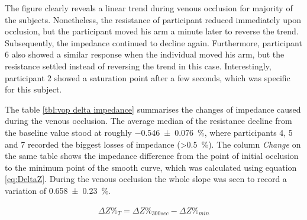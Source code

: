 The figure clearly reveals a linear trend during venous occlusion for majority of the subjects. Nonetheless, the resistance of participant reduced immediately upon occlusion, but the participant moved his arm a minute later to reverse the trend. Subsequently, the impedance continued to decline again. Furthermore, participant 6 also showed a similar response when the individual moved his arm, but the resistance settled instead of reversing the trend in this case. Interestingly, participant 2 showed a saturation point after a few seconds, which was specific for this subject. 

The table \ref{tbl:vop delta impedance} summarises the changes of impedance caused during the venous occlusion. The average median of the resistance decline from the baseline value stood at roughly \SI{-0.546(0076)}{\%}, where participants 4, 5 and 7 recorded the biggest losses of impedance (>\SI{0.5}{\%}). The column \textit{Change} on the same table shows the impedance difference from the point of initial occlusion to the minimum point of the smooth curve, which was calculated using equation \ref{eq:DeltaZ}. During the venous occlusion the whole slope was seen to record a variation of \SI{0.658(0230)}{\percent}.

\begin{align}
	\label{eq:DeltaZ}
	\Delta Z\%_T = \Delta Z\%_{300 sec} - \Delta Z\%_{min}
\end{align}


